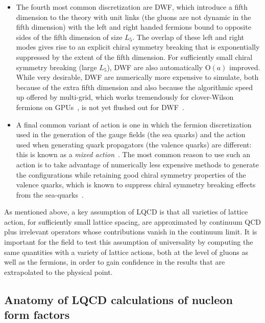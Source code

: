 \documentclass{ar-1col}
\begin{document}
\begin{itemize}[leftmargin=*]
\item The fourth most common discretization are DWF, which introduce a fifth dimension to the theory with unit links (the gluons are not dynamic in the fifth dimension) with the left and right handed fermions bound to opposite sides of the fifth dimension of size $L_5$.  The overlap of these left and right modes gives rise to an explicit chiral symmetry breaking that is exponentially suppressed by the extent of the fifth dimension.  For sufficiently small chiral symmetry breaking (large $L_5$), DWF are also automatically $\mathrm{O}(a)$ improved.
While very desirable, DWF are numerically more expensive to simulate, both because of the extra fifth dimension and also because the algorithmic speed up offered by multi-grid, which works tremendously for clover-Wilson fermions on GPUs~\cite{Clark:2016rdz}, is not yet flushed out for DWF~\cite{Boyle:2014rwa,Cohen:2011ivh,Yamaguchi:2016kop,Brower:2020xmc,Boyle:2021wcf}.

\item A final common variant of action is one in which the fermion discretization used in the generation of the gauge fields (the sea quarks) and the action used when generating quark propagators (the valence quarks) are different: this is known as a \textit{mixed action}~\cite{Renner:2004ck}.
The most common reason to use such an action is to take advantage of numerically less expensive methods to generate the configurations while retaining good chiral symmetry properties of the valence quarks, which is known to suppress chiral symmetry breaking effects from the sea-quarks~\cite{Bar:2002nr,Bar:2005tu,Tiburzi:2005is,Chen:2007ug}.

\end{itemize}
As mentioned above, a key assumption of LQCD is that all varieties of lattice action, for sufficiently small lattice spacing, are approximated by continuum QCD plus irrelevant operators whose contributions vanish in the continuum limit.
It is important for the field to test this assumption of universality by computing the same quantities with a variety of lattice actions, both at the level of gluons as well as the fermions, in order to gain confidence in the results that are extrapolated to the physical point.


\subsection{Anatomy of LQCD calculations of nucleon form factors\label{sec:calc_anatomy}}
\end{document}
